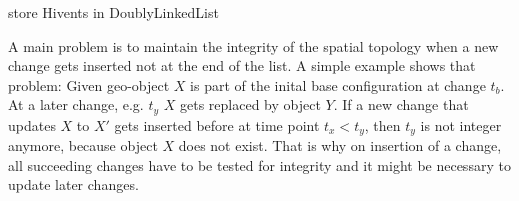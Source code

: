 store Hivents in DoublyLinkedList



A main problem is to maintain the integrity of the spatial topology when a new change gets inserted not at the end of the list. A simple example shows that problem: Given geo-object $X$ is part of the inital base configuration at change $t_b$. At a later change, e.g. $t_y$ $X$ gets replaced by object $Y$. If a new change that updates $X$ to $X'$ gets inserted before at time point $t_x < t_y$, then $t_y$ is not integer anymore, because object $X$ does not exist. That is why on insertion of a change, all succeeding changes have to be tested for integrity and it might be necessary to update later changes.




